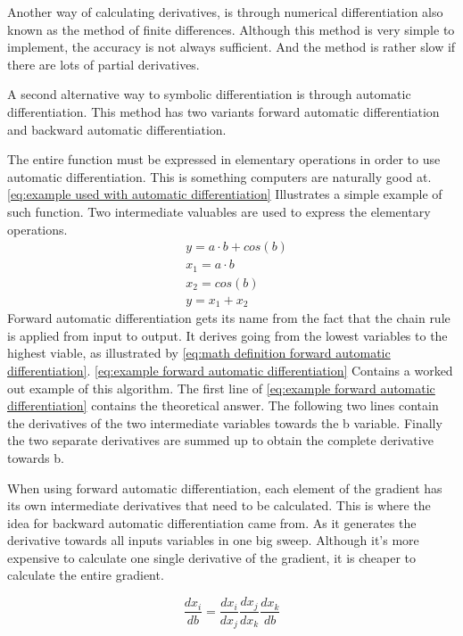 Another way of calculating derivatives, is through numerical differentiation also known as the method of finite differences. Although this method is very simple to implement, the accuracy is not always sufficient. And the method is rather slow if there are lots of partial derivatives.

A second alternative way to symbolic differentiation is through automatic differentiation. This method has two variants forward automatic differentiation and backward automatic differentiation.

The entire function must be expressed in elementary operations in order to use automatic differentiation. This is something computers are naturally good at. \eqref{eq:example used with automatic differentiation} Illustrates a simple example of such function. Two intermediate valuables are used to express the elementary operations.
\begin{equation}
	\begin{aligned}
		& y = a \cdot b + cos(b) \\
		& x_1 = a \cdot b \\
		& x_2 = cos(b) \\
		& y = x_1 + x_2		
	\end{aligned}
	\label{eq:example used with automatic differentiation}
\end{equation}
Forward automatic differentiation gets its name from the fact that the chain rule is applied from input to output. It derives going from the lowest variables to the highest viable, as illustrated by \eqref{eq:math definition forward automatic differentiation}. \eqref{eq:example forward automatic differentiation} Contains a worked out example of this algorithm. The first line of \eqref{eq:example forward automatic differentiation} contains the theoretical answer. The  following two lines contain the derivatives of the two intermediate variables towards the b variable. Finally the two separate derivatives are summed up to obtain the complete derivative towards b.

When using forward automatic differentiation, each element of the gradient has its own intermediate derivatives that need to be calculated. This is where the idea for backward automatic differentiation came from. As it generates the derivative towards all inputs variables in one big sweep. Although it's more expensive to calculate one single derivative of the gradient, it is cheaper to calculate the entire gradient.

\begin{equation}
	\frac{dx_i}{db} = \frac{dx_i}{dx_j}\frac{dx_j}{dx_k}\frac{dx_k}{db}
	\label{eq:math definition forward automatic differentiation}
\end{equation}

